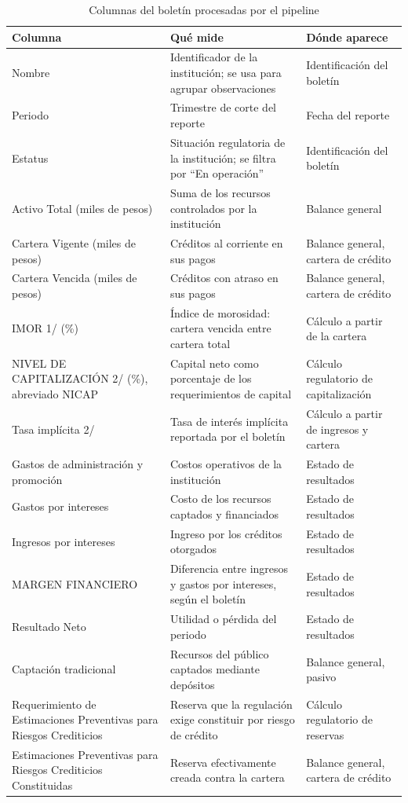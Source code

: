 \begin{table}[H]
\centering
\caption{Columnas del boletín procesadas por el pipeline}
\label{tab:met_columnas}
\small
\begin{tabularx}{\textwidth}{p{4.2cm}Xp{3.6cm}}
\toprule
\textbf{Columna} & \textbf{Qué mide} & \textbf{Dónde aparece} \\
\midrule
Nombre & Identificador de la institución; se usa para agrupar observaciones & Identificación del boletín \\
Periodo & Trimestre de corte del reporte & Fecha del reporte \\
Estatus & Situación regulatoria de la institución; se filtra por ``En operación'' & Identificación del boletín \\
Activo Total (miles de pesos) & Suma de los recursos controlados por la institución & Balance general \\
Cartera Vigente (miles de pesos) & Créditos al corriente en sus pagos & Balance general, cartera de crédito \\
Cartera Vencida (miles de pesos) & Créditos con atraso en sus pagos & Balance general, cartera de crédito \\
IMOR 1/ (\%) & Índice de morosidad: cartera vencida entre cartera total & Cálculo a partir de la cartera \\
NIVEL DE CAPITALIZACIÓN 2/ (\%), abreviado NICAP & Capital neto como porcentaje de los requerimientos de capital & Cálculo regulatorio de capitalización \\
Tasa implícita 2/ & Tasa de interés implícita reportada por el boletín & Cálculo a partir de ingresos y cartera \\
Gastos de administración y promoción & Costos operativos de la institución & Estado de resultados \\
Gastos por intereses & Costo de los recursos captados y financiados & Estado de resultados \\
Ingresos por intereses & Ingreso por los créditos otorgados & Estado de resultados \\
MARGEN FINANCIERO & Diferencia entre ingresos y gastos por intereses, según el boletín & Estado de resultados \\
Resultado Neto & Utilidad o pérdida del periodo & Estado de resultados \\
Captación tradicional & Recursos del público captados mediante depósitos & Balance general, pasivo \\
Requerimiento de Estimaciones Preventivas para Riesgos Crediticios & Reserva que la regulación exige constituir por riesgo de crédito & Cálculo regulatorio de reservas \\
Estimaciones Preventivas para Riesgos Crediticios Constituidas & Reserva efectivamente creada contra la cartera & Balance general, cartera de crédito \\
\bottomrule
\end{tabularx}
\end{table}

